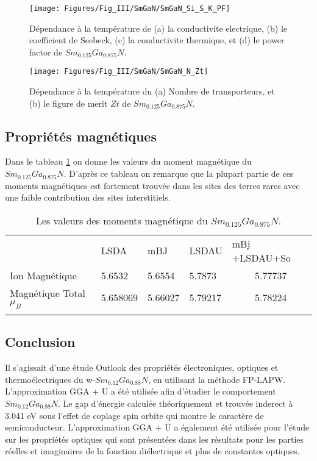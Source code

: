 \begin{figure}[h!]
	\centering
	\texttt{[image: Figures/Fig\_III/SmGaN/SmGaN\_Si\_S\_K\_PF]}
	\caption{Dépendance à la température de (a) la conductivite electrique, (b) le coefficient de Seebeck, (c) la conductivite thermique, et (d) le power factor de $ Sm_{0.125}Ga_{0.875}N $. }
	\label{fig:smgansiskpf}
	\texttt{[image: Figures/Fig\_III/SmGaN/SmGaN\_N\_Zt]}
	\caption{Dépendance à la température du (a) Nombre de transporteurs, et (b) le figure de merit $ Zt $ de $ Sm_{0.125}Ga_{0.875}N $.}
	\label{fig:smgannzt}
\end{figure}
\FloatBarrier

\subsection{Propriétés magnétiques}

Dans le tableau \ref{Magnetique_SmGaN} on donne les valeurs du moment magnétique du $ Sm_{0.125}Ga_{0.875}N$. D'après ce tableau on remarque que la plupart partie de ces moments magnétiques est fortement trouvée dans les sites des terres rares avec une faible contribution des sites interstitiels.

\begin{table}[h]
	\centering
	\begin{tabular}{lllll}
		\hline\noalign{\smallskip}		
		& LSDA & mBJ & LSDAU & mBj +LSDAU+So \\
		\noalign{\smallskip}\hline\noalign{\smallskip} 		
		Ion Magnétique & 5.6532 & 5.6554 & 5.7873 &  ~~~~ 5.77737 \\ 	
		Magnétique Total $ \mu_{B} $ & 5.658069 & 5.66027 & 5.79217 & ~~~~ 5.78224 \\
		\noalign{\smallskip}\hline
	\end{tabular}
	\caption{Les valeurs des moments magnétique du $ Sm_{0.125}Ga_{0.875}N $.}
	\label{Magnetique_SmGaN}
\end{table}
\FloatBarrier

\subsection{Conclusion}
Il s'agissait d'une étude Outlook des propriétés électroniques, optiques et thermoélectriques du w-$ Sm_{0.12}Ga_{0.88}N $, en utilisant la méthode FP-LAPW. L'approximation GGA + U a été utilisée afin d'étudier le comportement $ Sm_{0.12}Ga_{0.88}N $. Le gap d'énergie calculée théoriquement et trouvée inderect à 3.041 eV sous l'effet de coplage spin orbite qui montre le caractère de semiconducteur. L'approximation GGA + U a également été utilisée pour l'étude sur les propriétés optiques qui sont présentées dans les résultats pour les parties réelles et imaginaires de la fonction diélectrique et plus de constantes optiques. 

